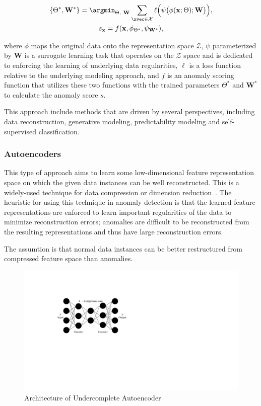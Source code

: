 \begin{gather}
    \{\Theta^*, \mathbf{W}^*\} = \argmin_{\Theta,\ \mathbf{W}} \sum_{\xvec \in \mathcal{X}}\ell\Big(\psi\big(\phi(\mathbf{x};\Theta);\mathbf{W}\big)\Big) \label{eqn:genericfeature1},\\
    s_{\mathbf{x}} = f(\mathbf{x}, \phi_{\Theta^*}, \psi_{\mathbf{W}^*}) \label{eqn:genericfeature2},
\end{gather}

where $\phi$ maps the original data onto the representation space $\mathcal{Z}$, $\psi$ parameterized by $\mathbf{W}$ is a surrogate learning task that operates on the $\mathcal{Z}$ space and is dedicated to enforcing the learning of underlying data regularities, $\ell$ is a loss function relative to the underlying modeling approach, and $f$ is an anomaly scoring function that utilizes these two functions with the trained parameters $\Theta^*$ and $\mathbf{W}^*$ to calculate the anomaly score $s$.

This approach include methods that are driven by several perspectives, including data reconstruction, generative modeling, predictability modeling and self-supervised classification.

\subsubsection{Autoencoders}
This type of approach aims to learn some low-dimensional feature representation space on which the given data instances can be well reconstructed. This is a widely-used technique for data compression or dimension reduction~\cite{hinton2006ae,jiang2014dimensionalityreductionae,theis2017dimensionalityreductionae}. The heuristic for using this technique in anomaly detection is that the learned feature representations are enforced to learn important regularities of the data to minimize reconstruction errors; anomalies are difficult to be reconstructed from the resulting representations and thus have large reconstruction errors.

The assumtion is that normal data instances can be better restructured from compressed feature space than anomalies.

\begin{figure}[htbp]
\centerline{\includegraphics[scale=1.0]{gfx/chap2/autoencoder.pdf}}
\caption{Architecture of Undercomplete Autoencoder}
\label{fig:autoencoder}
\end{figure}

